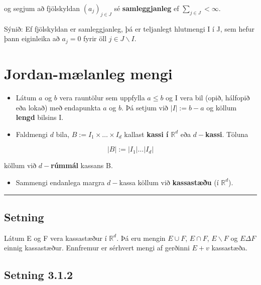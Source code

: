 \documentclass[]{book}
\providecommand{\tightlist}{%
  \setlength{\itemsep}{0pt}\setlength{\parskip}{0pt}}
\begin{document}
og segjum að fjölskyldan \((a_j)_{j\in J}\) sé \textbf{samleggjanleg} ef \(\sum_{j\in J} < \infty\).

Sýnið: Ef fjölskyldan er samleggjanleg, þá er teljanlegt hlutmengi I í J, sem hefur þann eiginleika að \(a_j = 0\) fyrir öll \(j \in J \backslash I\).

\hypertarget{jordan-mlanleg-mengi}{%
\chapter{Jordan-mælanleg mengi}\label{jordan-mlanleg-mengi}}

\begin{itemize}
\item
  Látum \(a\) og \(b\) vera rauntölur sem uppfylla \(a\leq b\) og I vera bil (opið, hálfopið eða lokað) með endapunkta \(a\) og \(b\). Þá setjum við \(|I| := b - a\) og köllum \textbf{lengd} bilsins I.
\item
  Faldmengi \(d\) bila, \(B := I_1 \times \dots \times I_d\) kallast \textbf{kassi í} \(\mathbb R^d\) eða \(d-\)\textbf{kassi}. Töluna
\end{itemize}

\[
|B| := |I_1| \dots |I_d|
\]

köllum við \(d-\)\textbf{rúmmál} kassans B.

\begin{itemize}
\tightlist
\item
  Sammengi endanlega margra \(d-\)kassa köllum við \textbf{kassastæðu} (í \(\mathbb R^d\)).
\end{itemize}

\begin{center}\rule{0.5\linewidth}{\linethickness}\end{center}

\hypertarget{setning-8}{%
\section{Setning}\label{setning-8}}

Látum E og F vera kassastæður í \(\mathbb R^d\). Þá eru mengin \(E\cup F\), \(E\cap F\), \(E\backslash F\) og \(E\Delta F\) einnig kassastæður. Ennfremur er sérhvert mengi af gerðinni \(E + v\) kassastæða.

\hypertarget{setning-3.1.2}{%
\section*{Setning 3.1.2}\label{setning-3.1.2}}
\end{document}
